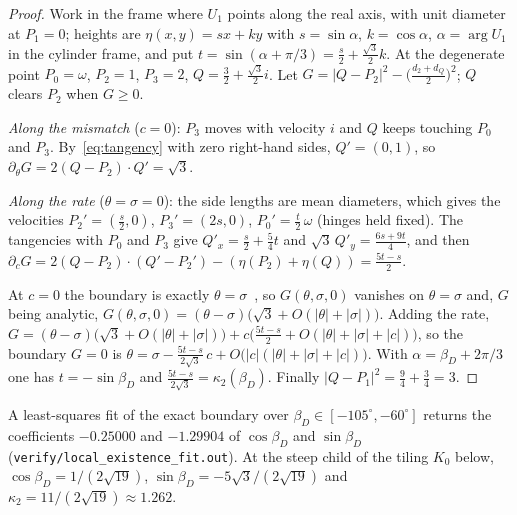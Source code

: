 \documentclass[11pt]{amsart}
\theoremstyle{definition}
\begin{document}
\begin{proof}
Work in the frame where $U_1$ points along the real axis, with unit diameter at $P_1=0$; heights are
$\eta(x,y)=sx+ky$ with $s=\sin\alpha$, $k=\cos\alpha$, $\alpha=\arg U_1$ in the cylinder frame, and put
$t=\sin(\alpha+\pi/3)=\tfrac s2+\tfrac{\sqrt3}2k$. At the degenerate point $P_0=\omega$, $P_2=1$, $P_3=2$,
$Q=\tfrac32+\tfrac{\sqrt3}2 i$. Let $G=|Q-P_2|^2-\bigl(\tfrac{d_2+d_Q}{2}\bigr)^2$; $Q$ clears $P_2$ when $G\ge0$.

\emph{Along the mismatch} ($c=0$): $P_3$ moves with velocity $i$ and $Q$ keeps touching $P_0$ and $P_3$.
By~\eqref{eq:tangency} with zero right-hand sides, $Q'=(0,1)$, so $\partial_\theta G=2(Q-P_2)\cdot Q'=\sqrt3$.

\emph{Along the rate} ($\theta=\sigma=0$): the side lengths are mean diameters, which gives the velocities
$P_2'=(\tfrac s2,0)$, $P_3'=(2s,0)$, $P_0'=\tfrac t2\,\omega$ (hinges held fixed). The tangencies with $P_0$
and $P_3$ give $Q'_x=\tfrac s2+\tfrac54t$ and $\sqrt3\,Q'_y=\tfrac{6s+9t}4$, and then
$\partial_cG=2(Q-P_2)\cdot(Q'-P_2')-(\eta(P_2)+\eta(Q))=\tfrac{5t-s}2$.

At $c=0$ the boundary is exactly $\theta=\sigma$~\cite[Prop.~4.3]{GD}, so $G(\theta,\sigma,0)$ vanishes on
$\theta=\sigma$ and, $G$ being analytic, $G(\theta,\sigma,0)=(\theta-\sigma)\bigl(\sqrt3+O(|\theta|+|\sigma|)\bigr)$. Adding
the rate, $G=(\theta-\sigma)\bigl(\sqrt3+O(|\theta|+|\sigma|)\bigr)+c\bigl(\tfrac{5t-s}2+O(|\theta|+|\sigma|+|c|)\bigr)$, so
the boundary $G=0$ is $\theta=\sigma-\frac{5t-s}{2\sqrt3}\,c+O\bigl(|c|(|\theta|+|\sigma|+|c|)\bigr)$. With $\alpha=\beta_D+2\pi/3$ one has
$t=-\sin\beta_D$ and $\frac{5t-s}{2\sqrt3}=\kappa_2(\beta_D)$. Finally $|Q-P_1|^2=\tfrac94+\tfrac34=3$.
\end{proof}

A least-squares fit of the exact boundary over $\beta_D\in[-105^\circ,-60^\circ]$ returns the coefficients
$-0.25000$ and $-1.29904$ of $\cos\beta_D$ and $\sin\beta_D$ (\texttt{verify/local\_existence\_fit.out}). At the steep child of the tiling $K_0$ below,
$\cos\beta_D=1/(2\sqrt{19})$, $\sin\beta_D=-5\sqrt3/(2\sqrt{19})$ and $\kappa_2=11/(2\sqrt{19})\approx1.262$.
\end{document}
